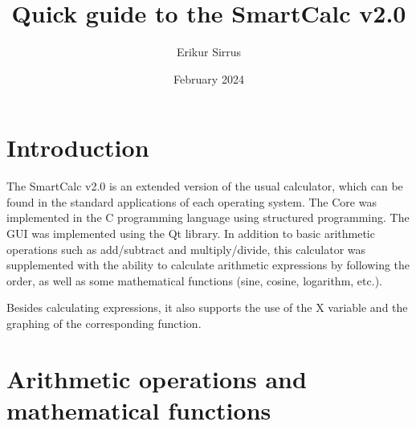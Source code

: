 \documentclass{article}
\title{Quick guide to the SmartCalc v2.0}
\author{Erikur Sirrus}
\date{February 2024}
\begin{document}
\maketitle
\pagebreak


\section{Introduction}
The SmartCalc v2.0 is an extended version of the usual calculator, which can be found in the standard applications of each operating system. The Core was implemented in the C programming language using structured programming. The GUI was implemented using the Qt library. In addition to basic arithmetic operations such as add/subtract and multiply/divide, this calculator was supplemented with the ability to calculate arithmetic expressions by following the order, as well as some mathematical functions (sine, cosine, logarithm, etc.).

Besides calculating expressions, it also supports the use of the X variable and the graphing of the corresponding function.

\section{Arithmetic operations and mathematical functions}
\end{document}
